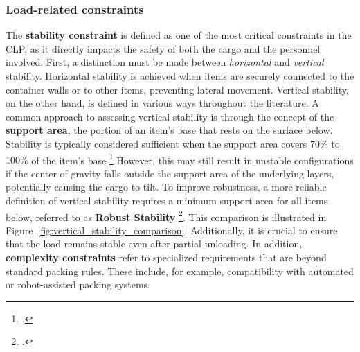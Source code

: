 \subsubsection{Load-related constraints}

The \textbf{stability constraint} is defined as one of the most critical constraints
in the \gls{CLP}, as it directly impacts the safety of both the cargo and the personnel involved.
First, a distinction must be made between \textit{horizontal} and \textit{vertical} stability.
Horizontal stability is achieved when items are securely connected to the
container walls or to other items, preventing lateral movement. Vertical
stability, on the other hand, is defined in various ways throughout the
literature. A common approach to assessing vertical stability is through the concept of the \textbf{support
    area}, the portion of an item's base that rests on the surface below. Stability is typically
considered sufficient when the support area covers $70\%$ to $100\%$ of the item’s base \footcite[cf.][p.344]{gendreau_tabu_2006} However,
this may still result in unstable configurations if the center of gravity falls outside the
support area of the underlying layers, potentially causing the cargo to tilt. To improve robustness,
a more reliable definition of vertical stability requires a minimum support area for all items below,
referred to as \textbf{Robust Stability} \footcite[cf.][p.1140]{ceschia_local_2013}. This comparison is illustrated in Figure~\ref{fig:vertical_stability_comparison}.
Additionally, it is crucial to ensure that the load remains stable even after partial unloading.
In addition, \textbf{complexity constraints} refer to specialized
requirements that are beyond standard packing rules. These include, for example, compatibility with automated or robot-assisted packing systems.

